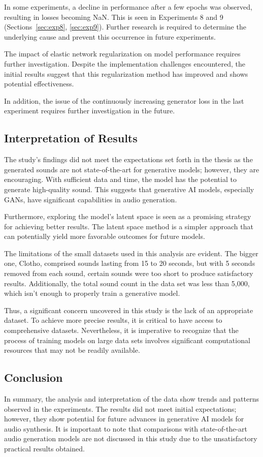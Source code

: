 In some experiments, a decline in performance after a few epochs was observed, resulting in losses becoming \ac{NaN}. This is seen in Experiments 8 and 9 (Sections~\ref{sec:exp8}, \ref{sec:exp9}). Further research is required to determine the underlying cause and prevent this occurrence in future experiments.

The impact of elastic network regularization on model performance requires further investigation. Despite the implementation challenges encountered, the initial results suggest that this regularization method has improved and shows potential effectiveness.

In addition, the issue of the continuously increasing generator loss in the last experiment requires further investigation in the future.

\subsection{Interpretation of Results}

The study's findings did not meet the expectations set forth in the thesis as the generated sounds are not state-of-the-art for generative models; however, they are encouraging. With sufficient data and time, the model has the potential to generate high-quality sound. This suggests that generative \ac{AI} models, especially \acp{GAN}, have significant capabilities in audio generation.

Furthermore, exploring the model's latent space is seen as a promising strategy for achieving better results. The latent space method is a simpler approach that can potentially yield more favorable outcomes for future models.

The limitations of the small datasets used in this analysis are evident. The bigger one, Clotho, comprised sounds lasting from 15 to 20 seconds, but with 5 seconds removed from each sound, certain sounds were too short to produce satisfactory results.  Additionally, the total sound count in the data set was less than 5,000, which isn't enough to properly train a generative model.

Thus, a significant concern uncovered in this study is the lack of an appropriate dataset. To achieve more precise results, it is critical to have access to comprehensive datasets. Nevertheless, it is imperative to recognize that the process of training models on large data sets involves significant computational resources that may not be readily available.

\subsection{Conclusion}

In summary, the analysis and interpretation of the data show trends and patterns observed in the experiments. The results did not meet initial expectations; however, they show potential for future advances in generative \ac{AI} models for audio synthesis. It is important to note that comparisons with state-of-the-art audio generation models are not discussed in this study due to the unsatisfactory practical results obtained. 